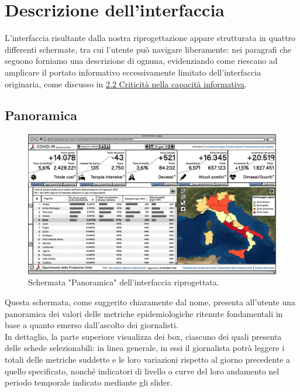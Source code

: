 \documentclass[../../main.tex]{subfiles}
\begin{document}
\clearpage
\section{Descrizione dell'interfaccia}
L'interfaccia risultante dalla nostra riprogettazione appare strutturata in quattro differenti schermate, tra cui l'utente può navigare liberamente: nei paragrafi che seguono forniamo una descrizione di ognuna, evidenziando come riescano ad amplicare il portato informativo eccessivamente limitato dell'interfaccia originaria, come discusso in \hyperref[ss:criticita-informative]{2.2 Criticità nella capacità informativa}.

\subsection{Panoramica}
\begin{figure}[h]
    \centering
    \includegraphics[width = \textwidth]{res/img/1 - Panoramica}
    \caption{Schermata "Panoramica" dell'interfaccia riprogettata.}
    \label{fig:panoramica}
\end{figure}

Questa schermata, come suggerito chiaramente dal nome, presenta all'utente una panoramica dei valori delle metriche epidemiologiche ritenute fondamentali in base a quanto emerso dall'ascolto dei giornalisti.\\
In dettaglio, la parte superiore visualizza dei box, ciascuno dei quali presenta delle schede selezionabili: in linea generale, in essi il giornalista potrà leggere i totali delle metriche suddette e le loro variazioni rispetto al giorno precedente a quello specificato, nonché indicatori di livello o curve del loro andamento nel periodo temporale indicato mediante gli slider.\\
\end{document}
